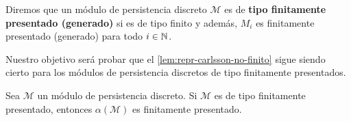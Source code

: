 \begin{definicion}
	Diremos que un módulo de persistencia discreto \(\mathcal{M}\) es de \textbf{tipo finitamente presentado (generado)} si es de tipo finito y además, \(M_i\) es finitamente presentado (generado) para todo \(i \in \mathbb{N}\).
\end{definicion}

Nuestro objetivo será probar que el \autoref{lem:repr-carlsson-no-finito} sigue siendo cierto para los módulos de persistencia discretos de tipo finitamente presentados.

\begin{lema}
	\label{lem:alpha-finito-presentado}
	Sea \(\mathcal{M}\) un módulo de persistencia discreto. Si \(\mathcal{M}\) es de tipo finitamente presentado, entonces \(\alpha(\mathcal{M})\) es finitamente presentado.
\end{lema}
